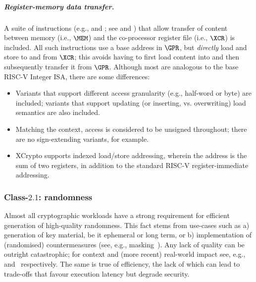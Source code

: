 \subparagraph{Register-memory   data transfer.}

A suite of instructions 
(e.g.,  and ; see  and )
that allow 
transfer of content between
   memory                         (i.e., $\MEM$)
and
the    co-processor register file (i.e., $\XCR$)
is included.
All such instructions use a base address in $\GPR$, but {\em directly} load 
and store to and from $\XCR$; this avoids having to first load content into 
and then subsequently transfer it from $\GPR$.
Although most are analogous to the base RISC-V Integer ISA, there are some
differences:

\begin{itemize}
\item Variants that support different access granularity (e.g., half-word or
      byte) are included; variants that support updating (or inserting, vs. 
      overwriting) load semantics are also included.
\item Matching the context, access is considered to be unsigned throughout;
      there are no sign-extending variants, for example.
\item XCrypto supports indexed load/store addressing, wherein the address
      is the sum of two registers, in addition to the standard RISC-V
      register-immediate addressing.
\end{itemize}


\subsubsection{Class-$2.1$: randomness}
\label{sec:bg:feature:2:1}

Almost all cryptographic workloads have a strong requirement for efficient
generation of high-quality randomness.  This fact stems from use-cases such
as
a) generation of key material, be it ephemeral or long term,
   or
b) implementation of (randomised) countermeasures
   (see, e.g., masking~\cite[Chapter 9]{SCARV:ManOswPop:07}).
Any lack of quality can be outright catastrophic;
for context and (more recent) real-world impact see, e.g.,~\cite{SCARV:KSWH:98,SCARV:RFC:4086} and~\cite{SCARV:NSSKM:17} respectively.
The same is true of efficiency, the lack of which can lead to trade-offs 
that favour execution latency but degrade security.

